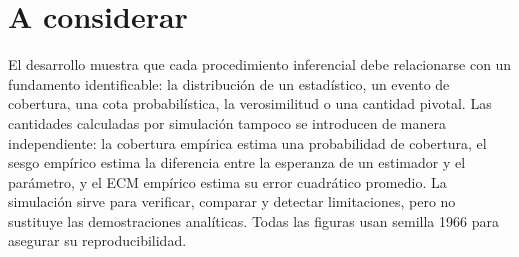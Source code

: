 \documentclass[10pt,a4paper,oneside]{article}
\begin{document}
\enlargethispage{2\baselineskip}\section*{A considerar}

El desarrollo muestra que cada procedimiento inferencial debe relacionarse con un fundamento identificable: la distribución de un estadístico, un evento de cobertura, una cota probabilística, la verosimilitud o una cantidad pivotal. Las cantidades calculadas por simulación tampoco se introducen de manera independiente: la cobertura empírica estima una probabilidad de cobertura, el sesgo empírico estima la diferencia entre la esperanza de un estimador y el parámetro, y el ECM empírico estima su error cuadrático promedio. La simulación sirve para verificar, comparar y detectar limitaciones, pero no sustituye las demostraciones analíticas. Todas las figuras usan semilla 1966 para asegurar su reproducibilidad.
\end{document}
